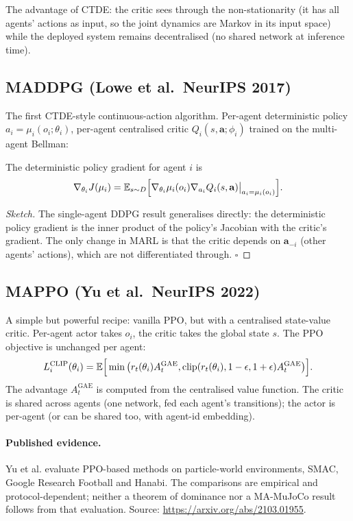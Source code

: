 \documentclass[11pt,oneside]{scrbook}
\begin{document}
The advantage of CTDE: the critic sees through the non-stationarity (it
has all agents' actions as input, so the joint dynamics are Markov in its
input space) while the deployed system remains decentralised (no shared
network at inference time).

\subsection{MADDPG (Lowe et al.\ NeurIPS 2017)}

The first CTDE-style continuous-action algorithm. Per-agent deterministic
policy $a_i = \mu_i(o_i; \theta_i)$, per-agent centralised critic
$Q_i(s, \mathbf{a}; \phi_i)$ trained on the multi-agent Bellman:

\begin{theorem}
The deterministic policy gradient for agent $i$ is
\[
\nabla_{\theta_i} J(\mu_i) = \mathbb{E}_{s \sim D}\Big[\nabla_{\theta_i} \mu_i(o_i) \nabla_{a_i} Q_i(s, \mathbf{a})\big|_{a_i = \mu_i(o_i)}\Big].
\]
\end{theorem}

\begin{proof}[Sketch]
The single-agent DDPG result generalises directly: the deterministic
policy gradient is the inner product of the policy's Jacobian with the
critic's gradient. The only change in MARL is that the critic depends
on $\mathbf{a}_{-i}$ (other agents' actions), which are not differentiated
through. $\square$
\end{proof}

\subsection{MAPPO (Yu et al.\ NeurIPS 2022)}

A simple but powerful recipe: vanilla PPO, but with a centralised
state-value critic. Per-agent actor takes $o_i$, the critic takes the
global state $s$. The PPO objective is unchanged per agent:
\[
L^{\mathrm{CLIP}}_i(\theta_i) = \mathbb{E}\Big[\min\big(r_t(\theta_i) A_t^{\mathrm{GAE}}, \mathrm{clip}(r_t(\theta_i), 1-\epsilon, 1+\epsilon) A_t^{\mathrm{GAE}}\big)\Big].
\]
The advantage $A_t^{\mathrm{GAE}}$ is computed from the centralised value
function. The critic is shared across agents (one network, fed each
agent's transitions); the actor is per-agent (or can be shared too, with
agent-id embedding).

\paragraph{Published evidence.}
Yu et al. evaluate PPO-based methods on particle-world environments, SMAC,
Google Research Football and Hanabi. The comparisons are empirical and
protocol-dependent; neither a theorem of dominance nor a MA-MuJoCo result
follows from that evaluation. Source: \url{https://arxiv.org/abs/2103.01955}.
\end{document}
